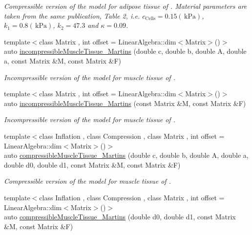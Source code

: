 \begin{DoxyCompactItemize}
\begin{DoxyCompactList}\small\item\em Compressible version of the model for adipose tissue of \cite{Sommer2013}. Material parameters are taken from the same publication, Table 2, i.\-e. $c_\mathrm{Cells}=0.15 (\,\mathrm{kPa})$, $k_1=0.8 (\,\mathrm{kPa})$, $k_2=47.3$ and $\kappa=0.09$. \end{DoxyCompactList}\item 
{\footnotesize template$<$class Matrix , int offset = Linear\-Algebra\-::dim$<$\-Matrix$>$()$>$ }\\auto \hyperlink{group__Biomechanics_gafcc36a1958899ca9246c4c1b3c9bfd85}{incompressible\-Muscle\-Tissue\-\_\-\-Martins} (double c, double b, double A, double a, const Matrix \&M, const Matrix \&F)
\begin{DoxyCompactList}\small\item\em Incompressible version of the model for muscle tissue of \cite{Martins1998}. \end{DoxyCompactList}\item 
{\footnotesize template$<$class Matrix , int offset = Linear\-Algebra\-::dim$<$\-Matrix$>$()$>$ }\\auto \hyperlink{group__Biomechanics_ga9e414585a90b1988e9fa88d17d875055}{incompressible\-Muscle\-Tissue\-\_\-\-Martins} (const Matrix \&M, const Matrix \&F)
\begin{DoxyCompactList}\small\item\em Incompressible version of the model for muscle tissue of \cite{Martins1998}. \end{DoxyCompactList}\item 
{\footnotesize template$<$class Inflation , class Compression , class Matrix , int offset = Linear\-Algebra\-::dim$<$\-Matrix$>$()$>$ }\\auto \hyperlink{group__Biomechanics_gad831914c493a3da04ed40c3c0ce87a62}{compressible\-Muscle\-Tissue\-\_\-\-Martins} (double c, double b, double A, double a, double d0, double d1, const Matrix \&M, const Matrix \&F)
\begin{DoxyCompactList}\small\item\em Compressible version of the model for muscle tissue of \cite{Martins1998}. \end{DoxyCompactList}\item 
{\footnotesize template$<$class Inflation , class Compression , class Matrix , int offset = Linear\-Algebra\-::dim$<$\-Matrix$>$()$>$ }\\auto \hyperlink{group__Biomechanics_ga46a70ccb2285e12addad87b6a8aaaae8}{compressible\-Muscle\-Tissue\-\_\-\-Martins} (double d0, double d1, const Matrix \&M, const Matrix \&F)

\end{DoxyCompactItemize}
